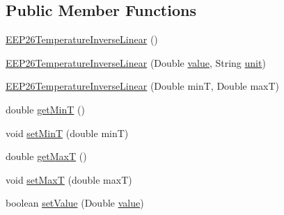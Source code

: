 \subsection*{Public Member Functions}
\begin{DoxyCompactItemize}
\item 
\hyperlink{classit_1_1polito_1_1elite_1_1enocean_1_1enj_1_1eep_1_1eep26_1_1attributes_1_1_e_e_p26_temperature_inverse_linear_ad1f05621e9869c85513aea0ae5653d0c}{E\+E\+P26\+Temperature\+Inverse\+Linear} ()
\item 
\hyperlink{classit_1_1polito_1_1elite_1_1enocean_1_1enj_1_1eep_1_1eep26_1_1attributes_1_1_e_e_p26_temperature_inverse_linear_a680eff8a4d4b0050c83b2592486d0e89}{E\+E\+P26\+Temperature\+Inverse\+Linear} (Double \hyperlink{classit_1_1polito_1_1elite_1_1enocean_1_1enj_1_1eep_1_1_e_e_p_attribute_af4d7e34642004bb6ccfae51e925c983d}{value}, String \hyperlink{classit_1_1polito_1_1elite_1_1enocean_1_1enj_1_1eep_1_1_e_e_p_attribute_a3fe5b3d613c30066354ad66eeb23b8ae}{unit})
\item 
\hyperlink{classit_1_1polito_1_1elite_1_1enocean_1_1enj_1_1eep_1_1eep26_1_1attributes_1_1_e_e_p26_temperature_inverse_linear_af9de8d637f609f3aa633c463a8f6461f}{E\+E\+P26\+Temperature\+Inverse\+Linear} (Double minT, Double maxT)
\item 
double \hyperlink{classit_1_1polito_1_1elite_1_1enocean_1_1enj_1_1eep_1_1eep26_1_1attributes_1_1_e_e_p26_temperature_inverse_linear_a341a93d17971901544183b60383bab1c}{get\+MinT} ()
\item 
void \hyperlink{classit_1_1polito_1_1elite_1_1enocean_1_1enj_1_1eep_1_1eep26_1_1attributes_1_1_e_e_p26_temperature_inverse_linear_a7bbbde1ed7be9d5bb2607225aeb855ef}{set\+MinT} (double minT)
\item 
double \hyperlink{classit_1_1polito_1_1elite_1_1enocean_1_1enj_1_1eep_1_1eep26_1_1attributes_1_1_e_e_p26_temperature_inverse_linear_a19728b3298fec112572a8faf763b6601}{get\+MaxT} ()
\item 
void \hyperlink{classit_1_1polito_1_1elite_1_1enocean_1_1enj_1_1eep_1_1eep26_1_1attributes_1_1_e_e_p26_temperature_inverse_linear_a09cf8df1a5fe48705605ce2ee79309f6}{set\+MaxT} (double maxT)
\item 
boolean \hyperlink{classit_1_1polito_1_1elite_1_1enocean_1_1enj_1_1eep_1_1eep26_1_1attributes_1_1_e_e_p26_temperature_inverse_linear_a8ccae4dcdd00c43d82ffd365d3d3a67c}{set\+Value} (Double \hyperlink{classit_1_1polito_1_1elite_1_1enocean_1_1enj_1_1eep_1_1_e_e_p_attribute_af4d7e34642004bb6ccfae51e925c983d}{value})
\item 

\end{DoxyCompactItemize}
